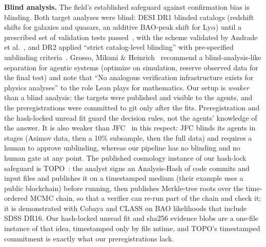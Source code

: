 \documentclass[11pt]{article}
\begin{document}
\textbf{Blind analysis.} The field's established safeguard against confirmation bias is blinding. Both target analyses were blind: DESI DR1 blinded
catalogs (redshift shifts for galaxies and quasars, an additive BAO-peak shift for Ly$\alpha$) until a prescribed set of validation tests
passed~\cite[Sec.~2.3.1]{desi2024vi}, with the scheme validated by Andrade et al.~\cite{andrade2024}, and DR2 applied ``strict catalog-level blinding'' with
pre-specified unblinding criteria~\cite[Secs.~II.A.1 and IX]{desi2025dr2}. Grosso, Mikuni \& Heinrich~\cite{grosso2026} recommend a blind-analysis-like
separation for agentic systems (optimize on simulation, reserve observed data for the final test) and note that ``No analogous verification infrastructure
exists for physics analyses'' to the role Lean plays for mathematics. Our setup is \emph{weaker} than a blind analysis: the targets were published and
visible to the agents, and the preregistrations were committed to git only after the fits. Preregistration and the hash-locked unread fit guard the
decision rules, not the agents' knowledge of the answer. It is also weaker than JFC~\cite{moreno2026} in this respect: JFC blinds its agents in stages (Asimov data,
then a 10\% subsample, then the full data) and requires a human to approve unblinding, whereas our pipeline has no blinding and no human gate at any point.
The published cosmology instance of our hash-lock safeguard is TOPO~\cite{topo2024}: the analyst signs an Analysis-Hash of code commits and input files and publishes it on
a timestamped medium (their example uses a public blockchain) before running, then publishes Merkle-tree roots over the time-ordered MCMC chain, so that a verifier can
re-run part of the chain and check it; it is demonstrated with Cobaya and CLASS on BAO likelihoods that include SDSS DR16. Our hash-locked unread fit and sha256
evidence blobs are a one-file instance of that idea, timestamped only by file mtime, and TOPO's timestamped commitment is exactly what our preregistrations lack.
\end{document}
